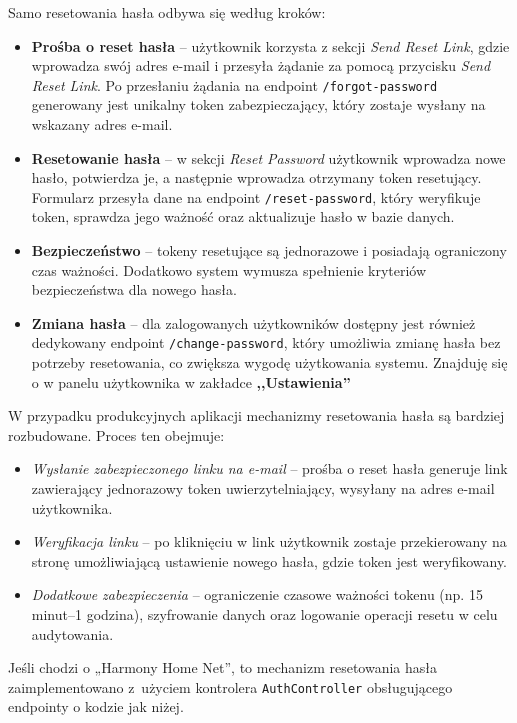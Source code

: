 Samo resetowania hasła odbywa się według kroków:
\begin{itemize}
    \item \textbf{Prośba o reset hasła} -- użytkownik korzysta z sekcji \emph{Send Reset Link}, gdzie wprowadza swój adres e-mail i przesyła żądanie za pomocą przycisku \emph{Send Reset Link}. Po przesłaniu żądania na endpoint \texttt{/forgot-password} generowany jest unikalny token zabezpieczający, który zostaje wysłany na wskazany adres e-mail.
    
    \item \textbf{Resetowanie hasła} -- w sekcji \emph{Reset Password} użytkownik wprowadza nowe hasło, potwierdza je, a następnie wprowadza otrzymany token resetujący. Formularz przesyła dane na endpoint \texttt{/reset-password}, który weryfikuje token, sprawdza jego ważność oraz aktualizuje hasło w bazie danych.

    \item \textbf{Bezpieczeństwo} -- tokeny resetujące są jednorazowe i posiadają ograniczony czas ważności. Dodatkowo system wymusza spełnienie kryteriów bezpieczeństwa dla nowego hasła.

    \item \textbf{Zmiana hasła} -- dla zalogowanych użytkowników dostępny jest również dedykowany endpoint \texttt{/change-password}, który umożliwia zmianę hasła bez potrzeby resetowania, co zwiększa wygodę użytkowania systemu. Znajduję się o w panelu użytkownika w zakładce \textbf{,,Ustawienia''}
\end{itemize}


W przypadku produkcyjnych aplikacji mechanizmy resetowania hasła są bardziej rozbudowane. Proces ten obejmuje:
\begin{itemize}
    \item \emph{Wysłanie zabezpieczonego linku na e-mail} -- prośba o reset hasła generuje link zawierający jednorazowy token uwierzytelniający, wysyłany na adres e-mail użytkownika.
    \item \emph{Weryfikacja linku} -- po kliknięciu w link użytkownik zostaje przekierowany na stronę umożliwiającą ustawienie nowego hasła, gdzie token jest weryfikowany.
    \item \emph{Dodatkowe zabezpieczenia} -- ograniczenie czasowe ważności tokenu (np. 15 minut–1 godzina), szyfrowanie danych oraz logowanie operacji resetu w celu audytowania.
\end{itemize}

Jeśli chodzi o „Harmony Home Net”, to mechanizm resetowania hasła zaimplementowano z~użyciem kontrolera \texttt{AuthController} obsługującego endpointy o kodzie jak niżej.

